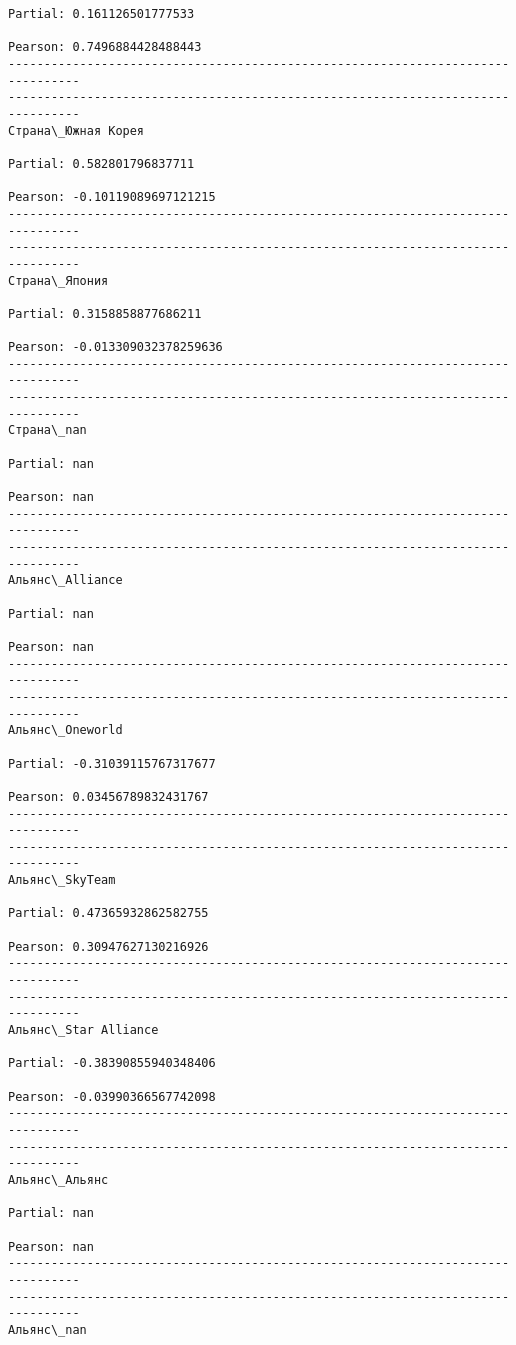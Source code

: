 \documentclass[11pt,mathletters]{article}
\begin{document}
\begin{Verbatim}[commandchars=\\\{\}]
Partial: 0.161126501777533

Pearson: 0.7496884428488443
--------------------------------------------------------------------------------
--------------------------------------------------------------------------------
Страна\_Южная Корея 

Partial: 0.582801796837711

Pearson: -0.10119089697121215
--------------------------------------------------------------------------------
--------------------------------------------------------------------------------
Страна\_Япония

Partial: 0.3158858877686211

Pearson: -0.013309032378259636
--------------------------------------------------------------------------------
--------------------------------------------------------------------------------
Страна\_nan

Partial: nan

Pearson: nan
--------------------------------------------------------------------------------
--------------------------------------------------------------------------------
Альянс\_Alliance

Partial: nan

Pearson: nan
--------------------------------------------------------------------------------
--------------------------------------------------------------------------------
Альянс\_Oneworld

Partial: -0.31039115767317677

Pearson: 0.03456789832431767
--------------------------------------------------------------------------------
--------------------------------------------------------------------------------
Альянс\_SkyTeam

Partial: 0.47365932862582755

Pearson: 0.30947627130216926
--------------------------------------------------------------------------------
--------------------------------------------------------------------------------
Альянс\_Star Alliance 

Partial: -0.38390855940348406

Pearson: -0.03990366567742098
--------------------------------------------------------------------------------
--------------------------------------------------------------------------------
Альянс\_Альянс

Partial: nan

Pearson: nan
--------------------------------------------------------------------------------
--------------------------------------------------------------------------------
Альянс\_nan


\end{Verbatim}
\end{document}
